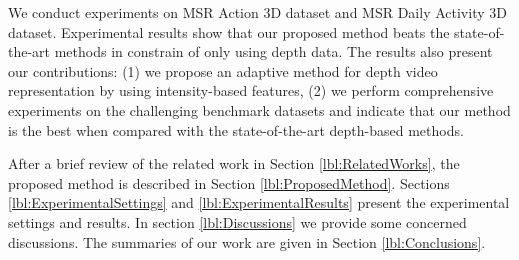 \documentclass[review]{elsarticle}
\begin{document}
We conduct experiments on MSR Action 3D dataset and MSR Daily Activity 3D dataset. Experimental results show that our proposed method beats the state-of-the-art methods in constrain of only using depth data. The results also present our contributions: (1) we propose an adaptive method for depth video representation by using intensity-based features, (2) we perform comprehensive experiments on the challenging benchmark datasets and indicate that our method is the best when compared with the state-of-the-art depth-based methods.

After a brief review of the related work in Section \ref{lbl:RelatedWorks}, the proposed method is described in Section \ref{lbl:ProposedMethod}. Sections \ref{lbl:ExperimentalSettings} and \ref{lbl:ExperimentalResults} present the experimental settings and results. In section \ref{lbl:Discussions} we provide some concerned discussions. The summaries of our work are given in Section \ref{lbl:Conclusions}.

\end{document}
